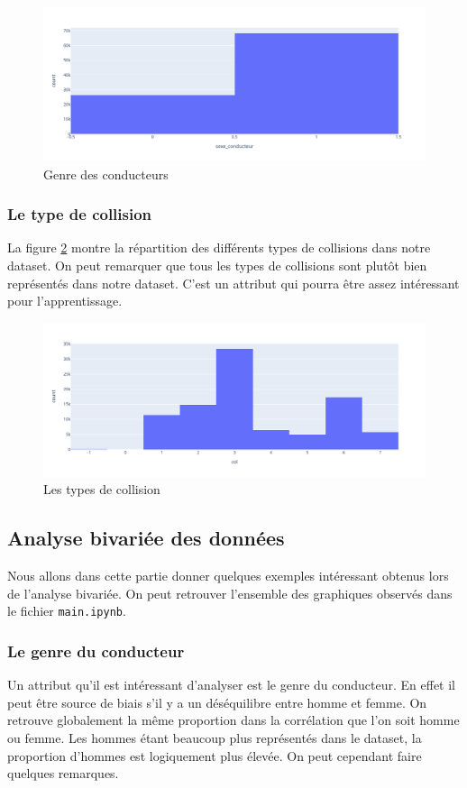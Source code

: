 \documentclass[]{article}
\begin{document}
    \begin{figure}[ht]
        \centering
        \includegraphics[width=12cm]{./img/sexe.png}
        \caption{Genre des conducteurs}
        \label{fig:fig_genre}
    \end{figure}

    \subsubsection{Le type de collision}
    La figure \ref{fig:fig_col} montre la répartition des différents types de collisions dans notre dataset. On peut 
    remarquer que tous les types de collisions sont plutôt bien représentés dans notre dataset. C'est un attribut qui 
    pourra être assez intéressant pour l'apprentissage.

    \begin{figure}[ht]
        \centering
        \includegraphics[width=12cm]{./img/col.png}
        \caption{Les types de collision}
        \label{fig:fig_col}
    \end{figure}

    \subsection{Analyse bivariée des données}
    Nous allons dans cette partie donner quelques exemples intéressant obtenus lors de l'analyse bivariée. On 
    peut retrouver l'ensemble des graphiques observés dans le fichier \texttt{main.ipynb}.

    \subsubsection{Le genre du conducteur}
    Un attribut qu'il est intéressant d'analyser est le genre du conducteur. En effet il peut être source de biais 
    s'il y a un déséquilibre entre homme et femme.
    On retrouve globalement la même proportion dans la corrélation que l'on soit homme ou femme. Les hommes étant 
    beaucoup plus représentés dans le dataset, la proportion d'hommes est logiquement plus élevée. On peut cependant 
    faire quelques remarques. 
    
\end{document}
